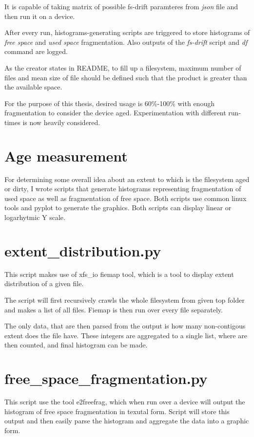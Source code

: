 \documentclass[
  color, %
  table, %
  lof,   %
  lot,   %
]{fithesis3}
\begin{document}
It is capable of taking matrix of possible fs-drift paramteres from \textit{json} file and then run it on a device.

After every run, histograms-generating scripts are triggered to store histograms of \textit{free space} and \textit{used space} fragmentation. Also outputs of the \textit{fs-drift} script and \textit{df} command are logged.

As the creator states in README, to fill up a filesystem, maximum number of files and mean size of file should be defined such that the product is greater than the available space.

For the purpose of this thesis, desired usage is 60\%-100\% with enough fragmentation to consider the device aged. Experimentation with different run-times is now heavily considered.

\section{Age measurement}
For determining some overall idea about an extent to which is the filesystem aged or dirty, I wrote scripts that generate histograms representing fragmentation of used space as well as fragmentation of free space. Both scripts use common linux tools and pyplot to generate the graphics. Both scripts can display linear or logarhytmic Y scale.

\section{extent\_distribution.py}
This script makes use of xfs\_io fiemap tool, which is a tool to display extent distribution of a given file. 

The script will first recursively crawls the whole filesystem from given top folder and makes a list of all files. Fiemap is then run over every file separately. 

The only data, that are then parsed from the output is how many non-contigous extent does the file have. These integers are aggregated to a single list, where are then counted, and final histogram can be made.

\section{free\_space\_fragmentation.py}
This script use the tool e2freefrag, which when run over a device will output the histogram of free space fragmentation in texutal form. Script will store this output and then easily parse the histogram and aggregate the data into a graphic form.
\end{document}
